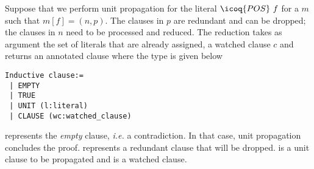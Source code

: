 \documentclass[utf8,a4paper,UKenglish,cleveref, autoref, thm-restate]{lipics-v2019}
\begin{document}
Suppose that we perform unit propagation for the literal
$\icoq{POS}\ f$ for a  $m$ such that $m[f] = (n,p)$.
The clauses in $p$ are redundant and can be dropped; the clauses in $n$
need to be processed and reduced. The reduction takes as argument the
set of literals that are already assigned, a watched clause $c$ and
returns an annotated clause  where the type
 is given below
\begin{verbatim}
Inductive clause:=
 | EMPTY  
 | TRUE
 | UNIT (l:literal)
 | CLAUSE (wc:watched_clause)
\end{verbatim}
 represents the \emph{empty} clause, \emph{i.e.} a
contradiction. In that case, unit propagation concludes the proof.
%
 represents a redundant clause that will be dropped.
%
 is a unit clause to be propagated and  is a watched clause.
\end{document}
